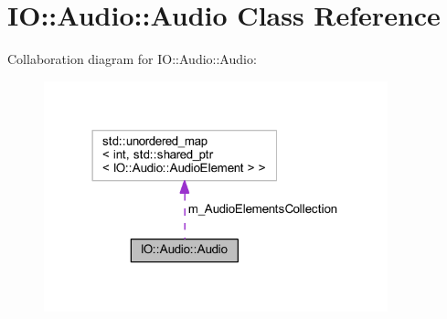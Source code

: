 \hypertarget{class_i_o_1_1_audio_1_1_audio}{}\section{IO\+:\+:Audio\+:\+:Audio Class Reference}
\label{class_i_o_1_1_audio_1_1_audio}


Collaboration diagram for IO\+:\+:Audio\+:\+:Audio\+:
\nopagebreak
\begin{figure}[H]
\begin{center}
\leavevmode
\includegraphics[width=282pt]{class_i_o_1_1_audio_1_1_audio__coll__graph}
\end{center}
\end{figure}
